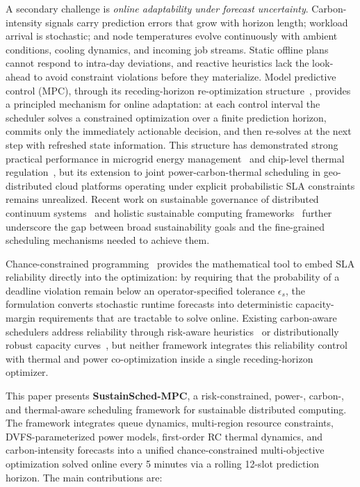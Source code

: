 \documentclass[a4paper,fleqn]{cas-dc}
\begin{document}
A secondary challenge is \emph{online adaptability under forecast uncertainty}. Carbon-intensity signals carry prediction errors that grow with horizon length; workload arrival is stochastic; and node temperatures evolve continuously with ambient conditions, cooling dynamics, and incoming job streams. Static offline plans cannot respond to intra-day deviations, and reactive heuristics lack the look-ahead to avoid constraint violations before they materialize. Model predictive control (MPC), through its receding-horizon re-optimization structure~\cite{ref-mayne00}, provides a principled mechanism for online adaptation: at each control interval the scheduler solves a constrained optimization over a finite prediction horizon, commits only the immediately actionable decision, and then re-solves at the next step with refreshed state information. This structure has demonstrated strong practical performance in microgrid energy management~\cite{ref-huang23,ref-zheng23} and chip-level thermal regulation~\cite{ref-tilli22,ref-perin21ease}, but its extension to joint power-carbon-thermal scheduling in geo-distributed cloud platforms operating under explicit probabilistic SLA constraints remains unrealized. Recent work on sustainable governance of distributed continuum systems~\cite{ref-donta23} and holistic sustainable computing frameworks~\cite{ref-pazienza24} further underscore the gap between broad sustainability goals and the fine-grained scheduling mechanisms needed to achieve them.

Chance-constrained programming~\cite{ref-nemirovski06} provides the mathematical tool to embed SLA reliability directly into the optimization: by requiring that the probability of a deadline violation remain below an operator-specified tolerance $\epsilon_s$, the formulation converts stochastic runtime forecasts into deterministic capacity-margin requirements that are tractable to solve online. Existing carbon-aware schedulers address reliability through risk-aware heuristics~\cite{ref-radovanovic21} or distributionally robust capacity curves~\cite{ref-hall24}, but neither framework integrates this reliability control with thermal and power co-optimization inside a single receding-horizon optimizer.

This paper presents \textbf{SustainSched-MPC}, a risk-constrained, power-, carbon-, and thermal-aware scheduling framework for sustainable distributed computing. The framework integrates queue dynamics, multi-region resource constraints, DVFS-parameterized power models, first-order RC thermal dynamics, and carbon-intensity forecasts into a unified chance-constrained multi-objective optimization solved online every 5 minutes via a rolling 12-slot prediction horizon. The main contributions are:
\end{document}
